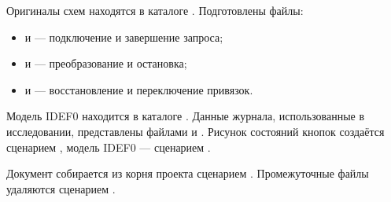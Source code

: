 Оригиналы схем находятся в каталоге . Подготовлены файлы:
\begin{itemize}
\item {} и  --- подключение и завершение запроса;
\item {} и  --- преобразование и остановка;
\item {} и  --- восстановление и переключение привязок.
\end{itemize}

Модель IDEF0 находится в каталоге . Данные журнала, использованные в исследовании, представлены файлами  и . Рисунок состояний кнопок создаётся сценарием , модель IDEF0 --- сценарием .

Документ собирается из корня проекта сценарием . Промежуточные файлы удаляются сценарием .
\clearpage
